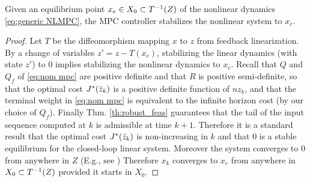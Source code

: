 
\begin{theorem}[Stability]
	\label{thm:stability}
Given an equilibrium point $x_e \in X_0 \subset T^{-1}(Z)$ of the nonlinear dynamics \eqref{eq:generic NLMPC}, the MPC controller stabilizes the nonlinear system to $x_e$.
\end{theorem}

\begin{proof}
Let $T$ be the diffeomorphism mapping $x$ to $z$ from feedback linearization.
By a change of variables $z' = z - T(x_e)$, stabilizing the linear dynamics (with state $z'$) to 0 implies stabilizing the nonlinear dynamics to $x_e$.
Recall that $Q$ and $Q_f$ of  \eqref{eq:nom mpc} are positive definite and that $R$ is positive semi-definite,  so that the optimal cost $J^*(\bar{z}_{k})$ is a positive definite function of $nz_{k}$, and that the terminal weight in \eqref{eq:nom mpc} is equivalent to the infinite horizon cost (by our choice of $Q_f$). 
Finally Thm.  \ref{th:robust_feas} guarantees that the tail of the input sequence computed at $k$ is admissible at time $k+1$. 
Therefore it is a standard result that the optimal cost $J^{*}(\bar{z}_{k})$ is non-increasing in $k$ and that $0$ is a stable equilibrium for the closed-loop linear system. 
Moreover the system converges to 0 from anywhere in $Z$ (E.g., see \cite{CannonK15MPC} )
Therefore $x_k$ converges to $x_e$ from anywhere in $X_0 \subset T^{-1}(Z)$ provided it starts in $X_0$.
\end{proof}